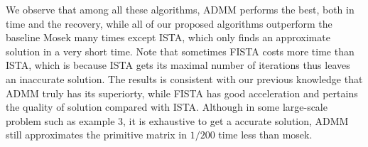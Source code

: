 \documentclass{article}
\begin{document}
We observe that among all these algorithms, ADMM performs the best, both in time and the recovery, while all of our proposed algorithms outperform the baseline Mosek many times except ISTA, which only finds an approximate solution in a very short time. Note that sometimes FISTA costs more time than ISTA, which is because ISTA gets its maximal number of iterations thus leaves an inaccurate solution. The results is consistent with our previous knowledge that ADMM truly has its superiorty, while FISTA has good acceleration and pertains the quality of solution compared with ISTA. Although in some large-scale problem such as example 3, it is exhaustive to get a accurate solution, ADMM still approximates the primitive matrix in $1/200$ time less than mosek.
	
  

\end{document}

